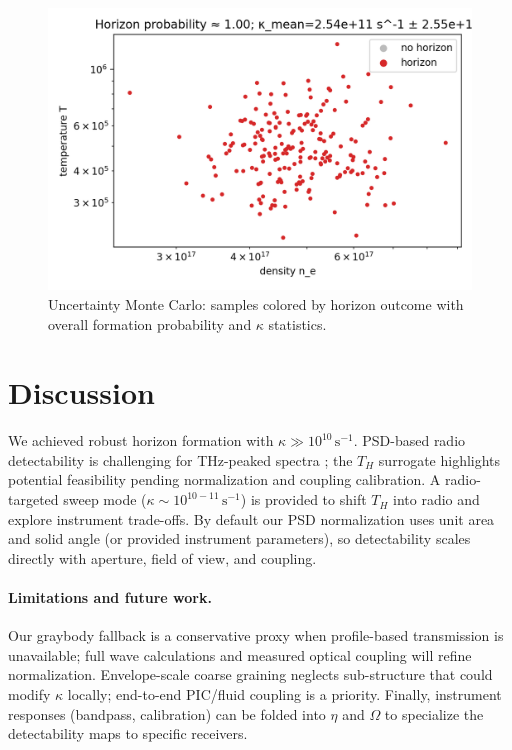 \documentclass[11pt]{article}
\begin{document}
\begin{figure}[h]
  \centering
  \includegraphics[width=0.75\linewidth]{figures/horizon_probability_bands.png}
  \caption{Uncertainty Monte Carlo: samples colored by horizon outcome with overall formation probability and $\kappa$ statistics.}
\end{figure}

\section{Discussion}
We achieved robust horizon formation with $\kappa\gg 10^{10}\,\mathrm{s^{-1}}$. PSD-based radio detectability is challenging for THz-peaked spectra \cite{Tonouchi2007}; the $T_H$ surrogate highlights potential feasibility pending normalization and coupling calibration. A radio-targeted sweep mode ($\kappa \sim 10^{10-11}\,\mathrm{s^{-1}}$) is provided to shift $T_H$ into radio and explore instrument trade-offs. By default our PSD normalization uses unit area and solid angle (or provided instrument parameters), so detectability scales directly with aperture, field of view, and coupling.

\paragraph{Limitations and future work.}
Our graybody fallback is a conservative proxy when profile-based transmission is unavailable; full wave calculations and measured optical coupling will refine normalization. Envelope-scale coarse graining neglects sub-structure that could modify $\kappa$ locally; end-to-end PIC/fluid coupling is a priority. Finally, instrument responses (bandpass, calibration) can be folded into $\eta$ and $\Omega$ to specialize the detectability maps to specific receivers.
\end{document}
